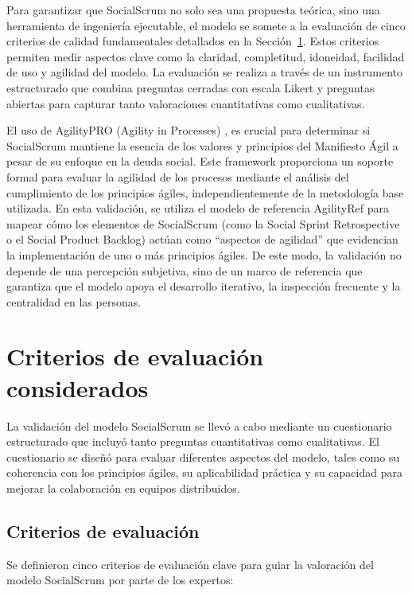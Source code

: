 Para garantizar que SocialScrum no solo sea una propuesta teórica, sino una herramienta de ingeniería ejecutable, el modelo se somete a la evaluación de cinco criterios de calidad fundamentales detallados en la Sección~\ref{sec:criterios-evaluacion}. Estos criterios permiten medir aspectos clave como la claridad, completitud, idoneidad, facilidad de uso y agilidad del modelo. La evaluación se realiza a través de un instrumento estructurado que combina preguntas cerradas con escala Likert y preguntas abiertas para capturar tanto valoraciones cuantitativas como cualitativas.

El uso de AgilityPRO (Agility in Processes) \cite{ortega2019agilityevaluation}, es crucial para determinar si SocialScrum mantiene la esencia de los valores y principios del Manifiesto Ágil a pesar de su enfoque en la deuda social. Este framework proporciona un soporte formal para evaluar la agilidad de los procesos mediante el análisis del cumplimiento de los principios ágiles, independientemente de la metodología base utilizada.
En esta validación, se utiliza el modelo de referencia AgilityRef para mapear cómo los elementos de SocialScrum (como la Social Sprint Retrospective o el Social Product Backlog) actúan como ``aspectos de agilidad'' que evidencian la implementación de uno o más principios ágiles. De este modo, la validación no depende de una percepción subjetiva, sino de un marco de referencia que garantiza que el modelo apoya el desarrollo iterativo, la inspección frecuente y la centralidad en las personas.

\section{Criterios de evaluación considerados}
\label{sec:criterios-evaluacion}
La validación del modelo SocialScrum se llevó a cabo mediante un cuestionario estructurado que incluyó tanto preguntas cuantitativas como cualitativas. El cuestionario se diseñó para evaluar diferentes aspectos del modelo, tales como su coherencia con los principios ágiles, su aplicabilidad práctica y su capacidad para mejorar la colaboración en equipos distribuidos.
\subsection{Criterios de evaluación}
Se definieron cinco criterios de evaluación clave para guiar la valoración del modelo SocialScrum por parte de los expertos:

\begingroup
\scriptsize
\renewcommand{\arraystretch}{1.4}
\setlength{\tabcolsep}{3pt}

